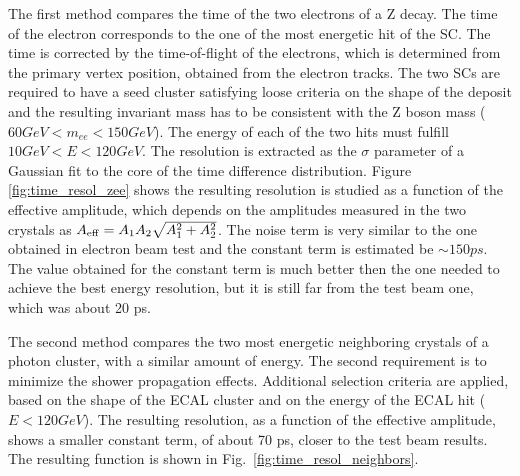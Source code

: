 \documentclass[journal]{IEEEtran}
\begin{document}
The first method compares the time of the two electrons of a Z decay. The time of the electron corresponds to the one of the most energetic hit of the SC. The time is corrected by the time-of-flight of the electrons, which is determined from the primary vertex position, obtained from the electron tracks. The two SCs are required to have a seed cluster satisfying loose criteria on the shape of the deposit and the resulting invariant mass has to be consistent with the Z boson mass ($60 GeV < m_{ee} < 150 GeV$). The energy of each of the two hits must fulfill $10 GeV<E<120 GeV$. The resolution is extracted as the $\sigma$ parameter of a Gaussian fit to the core of the time difference distribution. Figure \ref{fig:time_resol_zee} shows the resulting resolution is studied as a function of the effective amplitude, which depends on the amplitudes measured in the two crystals as $A_{\rm eff} = A_1 A_2 \sqrt{A_1^2 + A_2^2}$. The noise term is very similar to the one obtained in electron beam test and the constant term is estimated be $\sim 150 ps$. The value obtained for the constant term is much better then the one needed to achieve the best energy resolution, but it is still far from the test beam one, which was about 20 ps.

The second method compares the two most energetic neighboring crystals of a photon cluster, with a similar amount of energy. The second requirement is to minimize the shower propagation effects. Additional selection criteria are applied, based on the shape of the ECAL cluster and on the energy of the ECAL hit ($E<120 GeV$). The resulting resolution, as a function of the effective amplitude, shows a smaller constant term, of about 70 ps, closer to the test beam results. The resulting function is shown in Fig.~\ref{fig:time_resol_neighbors}.
\end{document}
